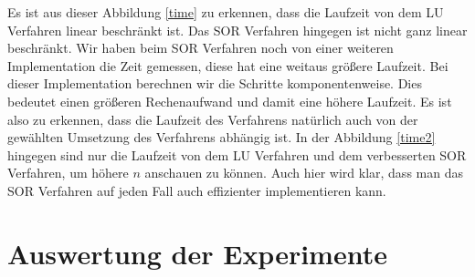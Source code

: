 \documentclass[smallheadings]{scrartcl}
\theoremstyle{definition}
\begin{document}
Es ist aus dieser Abbildung \ref{time} zu erkennen, dass die Laufzeit von dem LU Verfahren linear beschränkt ist.  Das SOR Verfahren hingegen ist nicht ganz linear beschränkt.  Wir haben beim SOR Verfahren noch von einer weiteren Implementation die Zeit gemessen, diese hat eine weitaus größere Laufzeit. Bei dieser Implementation berechnen wir die Schritte komponentenweise. Dies bedeutet einen größeren Rechenaufwand und damit eine höhere Laufzeit. Es ist also zu erkennen, dass die Laufzeit des Verfahrens natürlich auch 
von der gewählten Umsetzung des Verfahrens abhängig ist. 
In der Abbildung \ref{time2} hingegen sind nur die Laufzeit von dem LU Verfahren und dem verbesserten SOR Verfahren, um höhere $n$ anschauen zu können. Auch hier wird klar, dass man das SOR Verfahren auf jeden Fall auch effizienter implementieren kann.


\section{Auswertung der Experimente}
\end{document}
